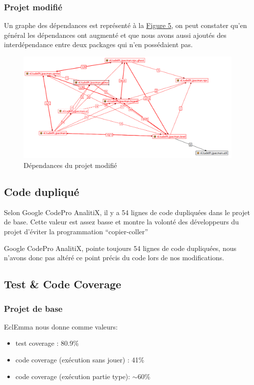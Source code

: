 \documentclass[a4paper,12pt]{report} %
\begin{document}
\subsubsection{Projet modifié}
Un graphe des dépendances est représenté à la \hyperref[figure5]{Figure 5}, on peut constater
qu'en général les dépendances ont augmenté et que nous avons aussi
ajoutés des interdépendance entre deux packages qui n'en possédaient
pas.

\begin{figure}[!h]
\begin{center}\includegraphics[scale=0.5]{ressources/final_new_dependencies}\end{center}\caption{Dépendances du projet modifié}\label{figure5}


\end{figure}

\subsection{Code dupliqué}
Selon Google CodePro AnalitiX, il y a 54 lignes de code dupliquées
dans le projet de base. Cette valeur est assez basse et montre la
volonté des développeurs du projet d'éviter la programmation ``copier-coller''

Google CodePro AnalitiX, pointe toujours 54 lignes de code dupliquées,
nous n'avons donc pas altéré ce point précis du code lors de nos modifications.


\subsection{Test \& Code Coverage}
\subsubsection{Projet de base}
EclEmma nous donne comme valeurs:
\begin{itemize}
\item test coverage : 80.9\%
\item code coverage (exécution sans jouer) : 41\%
\item code coverage (exécution partie type): $\sim$60\%
\end{itemize}
\end{document}
